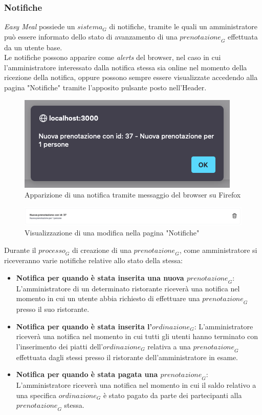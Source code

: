 \subsubsection{Notifiche}
\textit{Easy Meal} possiede un $\textit{sistema}_G$ di notifiche, tramite le quali un amministratore può essere informato dello stato di avanzamento di una $\textit{prenotazione}_G$ effettuata da un utente base. \\
Le notifiche possono apparire come \textit{alerts} del browser, nel caso in cui l'amministratore interessato dalla notifica stessa sia online nel momento della ricezione della notifica, oppure possono sempre essere visualizzate accedendo alla pagina "Notifiche" tramite l'apposito pulsante posto nell'Header. 
\begin{figure}[H]
    \centering
    \includegraphics[width=0.4\linewidth]{img/notifica_browser_admin.png}
    \caption{Apparizione di una notifica tramite messaggio del browser su Firefox}
\end{figure}
\begin{figure}[H]
    \centering
    \includegraphics[width=0.8\linewidth]{img/notifica_pagina_admin.png}
    \caption{Visualizzazione di una modifica nella pagina "Notifiche"}
\end{figure}
Durante il $\textit{processo}_G$ di creazione di una $\textit{prenotazione}_G$, come amministratore si riceveranno varie notifiche relative allo stato della stessa: 
\begin{itemize}
    \item \textbf{Notifica per quando è stata inserita una nuova $\textit{prenotazione}_G$}: L'amministratore di un determinato ristorante riceverà una notifica nel momento in cui un utente abbia richiesto di effettuare una $\textit{prenotazione}_G$ presso il suo ristorante. 
    \item \textbf{Notifica per quando è stata inserita l'$\textit{ordinazione}_G$}: L'amministratore riceverà una notifica nel momento in cui tutti gli utenti hanno terminato con l'inserimento dei piatti dell'$\textit{ordinazione}_G$ relativa a una $\textit{prenotazione}_G$ effettuata dagli stessi presso il ristorante dell'amministratore in esame. 
    \item \textbf{Notifica per quando è stata pagata una $\textit{prenotazione}_G$}: L'amministratore riceverà una notifica nel momento in cui il saldo relativo a una specifica $\textit{ordinazione}_G$ è stato pagato da parte dei partecipanti alla $\textit{prenotazione}_G$ stessa. 
\end{itemize}